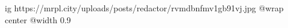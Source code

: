  
 
 
 
 

\ifcmt
  ig https://mrpl.city/uploads/posts/redactor/rvmdbnfmv1gb91vj.jpg
  @wrap center
  @width 0.9
\fi
